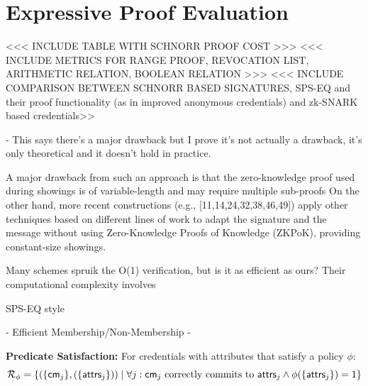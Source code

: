 \section{Expressive Proof Evaluation}\label{chap2:expressive_proofs}



<<< INCLUDE TABLE WITH SCHNORR PROOF COST >>>
<<< INCLUDE METRICS FOR RANGE PROOF, REVOCATION LIST, ARITHMETIC RELATION, BOOLEAN RELATION >>>
<<< INCLUDE COMPARISON BETWEEN SCHNORR BASED SIGNATURES, SPS-EQ and their proof functionality (as in improved anonymous credentials) and zk-SNARK based credentials>> 


- This says there's a major drawback but I prove it's not actually a drawback, it's only theoretical and it doesn't hold in practice.

    A major drawback from such an approach is that the zero-knowledge proof used during showings is of variable-length and may require multiple sub-proofs On the other hand, more recent constructions (e.g., [11,14,24,32,38,46,49]) apply other techniques based on different lines of work to adapt the signature and the message without using Zero-Knowledge Proofs of Knowledge (ZKPoK), providing constant-size showings.

Many schemes spruik the O(1) verification, but is it as efficient as ours? 
Their computational complexity involves 



SPS-EQ style

- Efficient Membership/Non-Membership
- 


































\textbf{Predicate Satisfaction:} For credentials with attributes that satisfy a policy $\phi$:
    \[
    \mathcal{R}_{\phi} = \{(\{\mathsf{cm}_j\}, (\{\mathsf{attrs}_j\})) \mid \forall j: \mathsf{cm}_j \text{ correctly commits to } \mathsf{attrs}_j \wedge
    \phi(\{\mathsf{attrs}_j\}) = 1 \}
    \]
    

